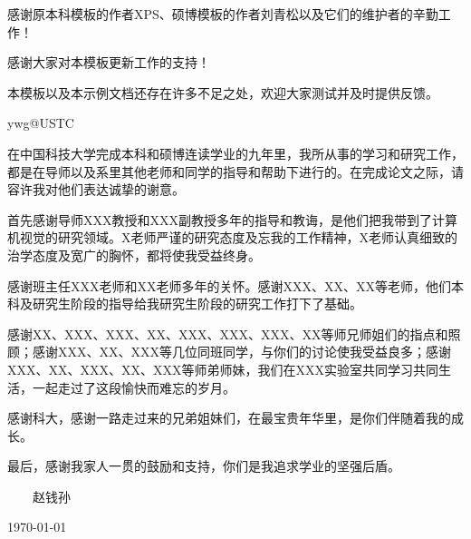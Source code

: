 ﻿
\begin{thanks}

感谢原本科模板的作者XPS、硕博模板的作者刘青松以及它们的维护者的辛勤工作！

感谢大家对本模板更新工作的支持！

本模板以及本示例文档还存在许多不足之处，欢迎大家测试并及时提供反馈。

\begin{flushright}
ywg@USTC
\end{flushright}


在中国科技大学完成本科和硕博连读学业的九年里，我所从事的学习和研究工作，都是在导师以及系里其他老师和同学的指导和帮助下进行的。在完成论文之际，请容许我对他们表达诚挚的谢意。

首先感谢导师XXX教授和XXX副教授多年的指导和教诲，是他们把我带到了计算机视觉的研究领域。X老师严谨的研究态度及忘我的工作精神，X老师认真细致的治学态度及宽广的胸怀，都将使我受益终身。

感谢班主任XXX老师和XX老师多年的关怀。感谢XXX、XX、XX等老师，他们本科及研究生阶段的指导给我研究生阶段的研究工作打下了基础。

感谢XX、XXX、XXX、XX、XXX、XXX、XXX、XX等师兄师姐们的指点和照顾；感谢XXX、XX、XXX等几位同班同学，与你们的讨论使我受益良多；感谢XXX、XX、XXX、XX、XXX等师弟师妹，我们在XXX实验室共同学习共同生活，一起走过了这段愉快而难忘的岁月。

感谢科大，感谢一路走过来的兄弟姐妹们，在最宝贵年华里，是你们伴随着我的成长。

最后，感谢我家人一贯的鼓励和支持，你们是我追求学业的坚强后盾。

\vskip 18pt

\begin{flushright}

~~~~赵钱孙~~~~

\today

\end{flushright}

\end{thanks}
